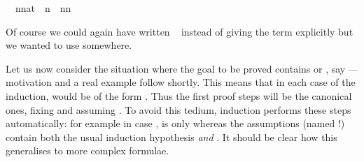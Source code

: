 \begin{isabellebody}
\begin{isamarkuptext}
\end{isamarkuptext}%
\isamarkuptrue%
\ \ n{\isacharcolon}{\isacharcolon}nat\ \ {\isachardoublequote}n\ {\isacharless}\ n{\isacharasterisk}n\ {\isacharplus}\ {}{\isachardoublequote}\isanewline
\isamarkupfalse%
\isamarkupfalse%
\isamarkupfalse%
\isamarkupfalse%
\isamarkupfalse%
\isamarkupfalse%
\isamarkupfalse%
\isamarkupfalse%
\isamarkupfalse%
\isamarkupfalse%
%
\begin{isamarkuptext}%
\noindent Of course we could again have written
~ instead of giving the term explicitly
but we wanted to use  somewhere.%
\end{isamarkuptext}%
\isamarkuptrue%
%
\isamarkuptrue%
%
\begin{isamarkuptext}%
Let us now consider the situation where the goal to be proved contains
\isa{{\isasymAnd}} or \isa{{\isasymLongrightarrow}}, say  --- motivation and a
real example follow shortly.  This means that in each case of the induction,
 would be of the form .  Thus the
first proof steps will be the canonical ones, fixing  and assuming
. To avoid this tedium, induction performs these steps
automatically: for example in case ,  is only
 whereas the assumptions (named !) contain both the
usual induction hypothesis \emph{and} .
It should be clear how this generalises to more complex formulae.


\end{isamarkuptext}
\end{isabellebody}
